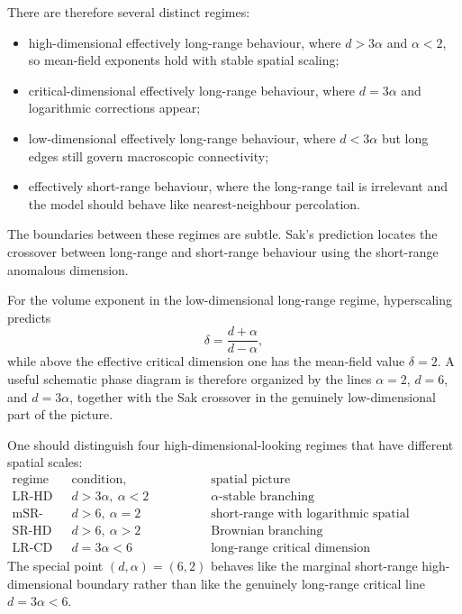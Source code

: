 \documentclass[11pt,reqno]{book}
\numberwithin{equation}{chapter}
\theoremstyle{plain}
\theoremstyle{definition}
\theoremstyle{remark}
\newcommand{\1}{\mathbf 1}
\begin{document}
There are therefore several distinct regimes:
\begin{itemize}[leftmargin=*]
\item high-dimensional effectively long-range behaviour, where $d>3\alpha$ and $\alpha<2$, so mean-field exponents hold with stable spatial scaling;
\item critical-dimensional effectively long-range behaviour, where $d=3\alpha$ and logarithmic corrections appear;
\item low-dimensional effectively long-range behaviour, where $d<3\alpha$ but long edges still govern macroscopic connectivity;
\item effectively short-range behaviour, where the long-range tail is irrelevant and the model should behave like nearest-neighbour percolation.
\end{itemize}
The boundaries between these regimes are subtle. Sak's prediction locates the crossover between long-range and short-range behaviour using the short-range anomalous dimension.

For the volume exponent in the low-dimensional long-range regime, hyperscaling predicts
\[
  \delta=\frac{d+\alpha}{d-\alpha},
\]
while above the effective critical dimension one has the mean-field value $\delta=2$. A useful schematic phase diagram is therefore organized by the lines $\alpha=2$, $d=6$, and $d=3\alpha$, together with the Sak crossover in the genuinely low-dimensional part of the picture.

One should distinguish four high-dimensional-looking regimes that have different spatial scales:
\[
\begin{array}{c|c|c}
\text{regime} & \text{condition, schematically} & \text{spatial picture}\\
\hline
\text{LR-HD} & d>3\alpha,\ \alpha<2 & \alpha\text{-stable branching}\\
\text{mSR-HD} & d>6,\ \alpha=2 & \text{short-range with logarithmic spatial correction}\\
\text{SR-HD} & d>6,\ \alpha>2 & \text{Brownian branching}\\
\text{LR-CD} & d=3\alpha<6 & \text{long-range critical dimension}
\end{array}
\]
The special point $(d,\alpha)=(6,2)$ behaves like the marginal short-range high-dimensional boundary rather than like the genuinely long-range critical line $d=3\alpha<6$.
\end{document}
